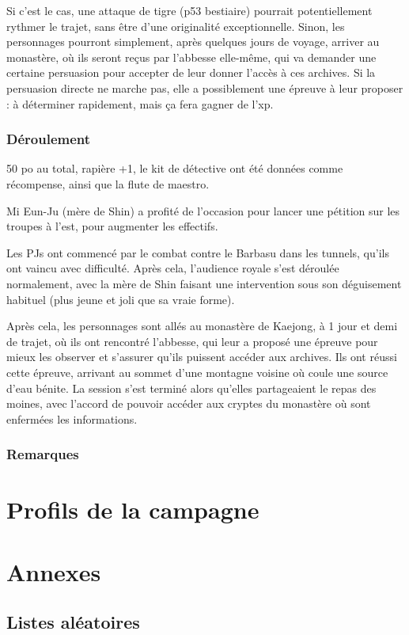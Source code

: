 \documentclass[10pt,a4paper]{book}
\begin{document}
Si c'est le cas, une attaque de tigre (p53 bestiaire) pourrait potentiellement rythmer le trajet, sans être d'une originalité exceptionnelle. Sinon, les personnages pourront simplement, après quelques jours de voyage, arriver au monastère, où ils seront reçus par l'abbesse elle-même, qui va demander une certaine persuasion pour accepter de leur donner l'accès à ces archives. Si la persuasion directe ne marche pas, elle a possiblement une épreuve à leur proposer : à déterminer rapidement, mais ça fera gagner de l'xp.

\subsection{Déroulement}
50 po au total, rapière +1, le kit de détective ont été données comme récompense, ainsi que la flute de maestro.

Mi Eun-Ju (mère de Shin) a profité de l'occasion pour lancer une pétition sur les troupes à l'est, pour augmenter les effectifs.

Les PJs ont commencé par le combat contre le Barbasu dans les tunnels, qu'ils ont vaincu avec difficulté. Après cela, l'audience royale s'est déroulée normalement, avec la mère de Shin faisant une intervention sous son déguisement habituel (plus jeune et joli que sa vraie forme).

Après cela, les personnages sont allés au monastère de Kaejong, à 1 jour et demi de trajet, où ils ont rencontré l'abbesse, qui leur a proposé une épreuve pour mieux les observer et s'assurer qu'ils puissent accéder aux archives. Ils ont réussi cette épreuve, arrivant au sommet d'une montagne voisine où coule une source d'eau bénite. La session s'est terminé alors qu'elles partageaient le repas des moines, avec l'accord de pouvoir accéder aux cryptes du monastère où sont enfermées les informations.
\subsection{Remarques}
\chapter{Profils de la campagne}
\chapter*{Annexes}
\section*{Listes aléatoires}
\end{document}
